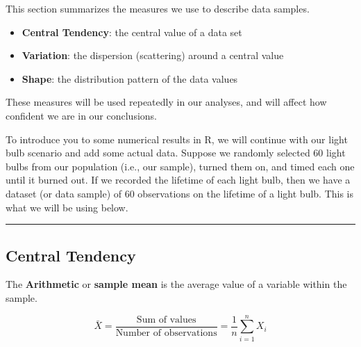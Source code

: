 \documentclass[
]{book}
\begin{document}
This section summarizes the measures we use to describe data samples.

\begin{itemize}
\item
  \textbf{Central Tendency}: the central value of a data set
\item
  \textbf{Variation}: the dispersion (scattering) around a central value
\item
  \textbf{Shape}: the distribution pattern of the data values
\end{itemize}

These measures will be used repeatedly in our analyses, and will affect how confident we are in our conclusions.

To introduce you to some numerical results in R, we will continue with our light bulb scenario and add some actual data. Suppose we randomly selected 60 light bulbs from our population (i.e., our sample), turned them on, and timed each one until it burned out. If we recorded the lifetime of each light bulb, then we have a dataset (or data sample) of 60 observations on the lifetime of a light bulb. This is what we will be using below.

\begin{center}\rule{0.5\linewidth}{0.5pt}\end{center}

\subsection{Central Tendency}\label{central-tendency}

The \textbf{Arithmetic} or \textbf{sample mean} is the average value of a variable within the sample.

\[\bar{X}=\frac{\text{Sum of values}}{\text{Number of observations}}=\frac{1}{n} \sum\limits_{i=1}^n X_i\]
\end{document}
